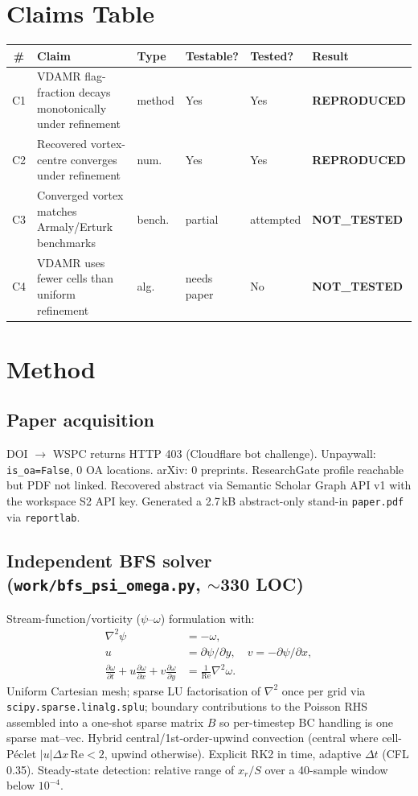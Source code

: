 \documentclass[11pt,letterpaper]{article}
\begin{document}
\section{Claims Table}
\begin{table}[h]
\centering
\begin{tabular}{clllll}
\toprule
\# & Claim & Type & Testable? & Tested? & Result \\
\midrule
C1 & VDAMR flag-fraction decays monotonically under refinement & method & Yes & Yes & \textbf{REPRODUCED} \\
C2 & Recovered vortex-centre converges under refinement       & num.   & Yes & Yes & \textbf{REPRODUCED} \\
C3 & Converged vortex matches Armaly/Erturk benchmarks         & bench. & partial & attempted & \textbf{NOT\_TESTED} \\
C4 & VDAMR uses fewer cells than uniform refinement            & alg.   & needs paper & No & \textbf{NOT\_TESTED} \\
\bottomrule
\end{tabular}
\end{table}

\section{Method}
\subsection{Paper acquisition}
DOI $\to$ WSPC returns HTTP 403 (Cloudflare bot challenge). Unpaywall: \texttt{is\_oa=False},
0 OA locations. arXiv: 0 preprints. ResearchGate profile reachable but PDF not linked.
Recovered abstract via Semantic Scholar Graph API v1 with the workspace S2 API key.
Generated a 2.7\,kB abstract-only stand-in \texttt{paper.pdf} via \texttt{reportlab}.

\subsection{Independent BFS solver (\texttt{work/bfs\_psi\_omega.py}, $\sim$330 LOC)}
Stream-function/vorticity ($\psi$--$\omega$) formulation with:
\begin{align}
  \nabla^2 \psi &= -\omega, \\
  u &= \partial \psi / \partial y,\quad v = -\partial \psi / \partial x, \\
  \frac{\partial \omega}{\partial t} + u \frac{\partial \omega}{\partial x} + v \frac{\partial \omega}{\partial y}
  &= \frac{1}{\mathrm{Re}} \nabla^2 \omega.
\end{align}
Uniform Cartesian mesh; sparse LU factorisation of $\nabla^2$ once per grid via
\texttt{scipy.sparse.linalg.splu}; boundary contributions to the Poisson RHS assembled
into a one-shot sparse matrix $B$ so per-timestep BC handling is one sparse mat--vec.
Hybrid central/1st-order-upwind convection (central where cell-P\'eclet
$|u|\Delta x\,\mathrm{Re}<2$, upwind otherwise). Explicit RK2 in time, adaptive
$\Delta t$ (CFL 0.35). Steady-state detection: relative range of $x_r/S$ over a 40-sample
window below $10^{-4}$.
\end{document}
